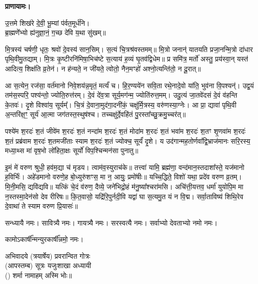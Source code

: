 \textbf{प्राणायामः।}


उ॒त्तमे शिख॑रे दे॒वी॒ भू॒म्यां प॑र्वत॒मूर्ध॑नि।\\
ब्रा॒ह्मणे॑॑भ्यो ह्य॑नुज्ञा॒नं॒ ग॒च्छ दे॑वि य॒था सु॑खम्॥


मि॒त्रस्य॑ चर्\mbox{}षणी॒ धृतः॒ श्रवो॑ दे॒वस्य॑ सान॒सिम्। स॒त्यं चि॒त्रश्र॑वस्तमम्॥ मि॒त्रो जनान्॑ यातयति प्रजा॒नन्मि॒त्रो दा॑धार पृथि॒वीमु॒तद्याम्। मि॒त्रः कृ॒ष्टीरनि॑मिषा॒भिच॑ष्टे स॒त्याय॑ ह॒व्यं घृ॒तव॑द्विधेम॥ प्र समि॑त्र॒ मर्तो॑ अस्तु॒ प्रय॑स्वा॒न् यस्त॑ आदित्य॒ शिक्ष॑ति व्र॒तेन॑। न ह॑न्यते॒ न जी॑यते॒ त्वोतो॒ नैन॒मꣳहो॑ अश्नो॒त्यन्ति॑तो॒ न दू॒रात्॥


आ स॒त्येन॒ रज॑सा॒ वर्त॑मानो निवे॒शय॑न्न॒मृतं॒ मर्त्यं॑ च। हि॒र॒ण्यये॑न सवि॒ता रथे॒नादे॒वो या॑ति॒ भुव॑ना वि॒पश्यन्॑। उद्व॒यं तम॑स॒स्परि॒ पश्य॑न्तो॒ ज्योति॒रुत्त॑रम्। दे॒वं दे॑व॒त्रा सूर्य॒मग॑न्म॒ ज्योति॑रुत्त॒मम्। उदु॒त्यं जा॒तवे॑दसं दे॒वं व॑हन्ति के॒तवः॑। दृ॒शे विश्वा॑य॒ सूर्यम्᳚। चि॒त्रं दे॒वाना॒मुद॑गा॒दनी॑कं॒ चक्षु॑र्मि॒त्रस्य॒ वरु॑णस्या॒ग्नेः। आ प्रा॒ द्यावा॑ पृथि॒वी अ॒न्तरि॑क्ष॒ꣳ॒ सूर्य॑ आ॒त्मा जग॑तस्त॒स्थुष॑श्च। तच्चक्षु॑र्दे॒वहि॑तं पु॒रस्ता᳚च्छु॒क्रमु॒च्चर॑त्॥

पश्ये॑म श॒रदः॑ श॒तं जीवे॑म श॒रदः॑ श॒तं नन्दा॑म श॒रदः॑ श॒तं मोदा॑म श॒रदः॑ श॒तं भवा॑म श॒रदः॑ श॒तꣳ शृ॒णवा॑म श॒रदः॑ श॒तं प्रब्र॑वाम श॒रदः॑ श॒तमजी॑ताः स्याम श॒रदः॑ श॒तं ज्योक्च॒ सूर्यं॑ दृ॒शे। य उद॑गान्मह॒तोर्णवा᳚द्वि॒भ्राज॑मानः सरि॒रस्य॒ मध्या॒थ्स मा॑ वृष॒भो लो॑हिता॒क्षः सूर्यो॑ विप॒श्चिन्मन॑सा पुनातु॥

इ॒मं मे॑ वरुण श्रुधी॒ हव॑म॒द्या च॑ मृडय। त्वाम॑व॒स्युराच॑के॥ तत्त्वा॑ यामि॒ ब्रह्म॑णा॒ वन्द॑मान॒स्तदाशा᳚स्ते॒ यज॑मानो ह॒विर्भिः॑। अहे॑डमानो वरुणे॒ह बो॒ध्युरु॑शꣳस॒ मा न॒ आयुः॒ प्रमो॑षीः॥
यच्चि॒द्धिते॒ विशो॑ यथा॒ प्रदे॑व वरुण व्र॒तम्। मि॒नी॒मसि॒ द्यवि॑द्यवि॥ यत्किं चे॒दं व॑रुण॒ दैव्ये॒ जने॑भिद्रो॒हं म॑नु॒ष्या᳚श्चरा॑मसि। अचि॑त्ती॒यत्तव॒ धर्मा॑ युयोपि॒म मा न॒स्तस्मा॒देन॑सो देव रीरिषः॥ कि॒त॒वासो॒ यद्रि॑रि॒पुर्नदी॒वि यद्वा॑ घा स॒त्यमु॒त यं न वि॒द्म। सर्वा॒ताविष्य॑ शिथि॒रेव दे॒वाथा॑ ते स्याम वरुण प्रि॒यासः॑॥


सन्ध्यायै नमः।  
सावित्र्यै नमः। 
गायत्र्यै नमः।  
सरस्वत्यै नमः।  
सर्वाभ्यो देवताभ्यो नमो नमः। 

कामोऽकार्\mbox{}षी᳚न्मन्युरकार्\mbox{}षी᳚न्नमो॒ नमः।

अभिवादये \blank{} (त्रयार्षेय) प्रवरान्वित \blank{} गोत्रः\\
(आपस्तम्ब) सूत्रः यजुःशाखा अध्यायी\\
() शर्मा नामाहम् अस्मि भोः॥

